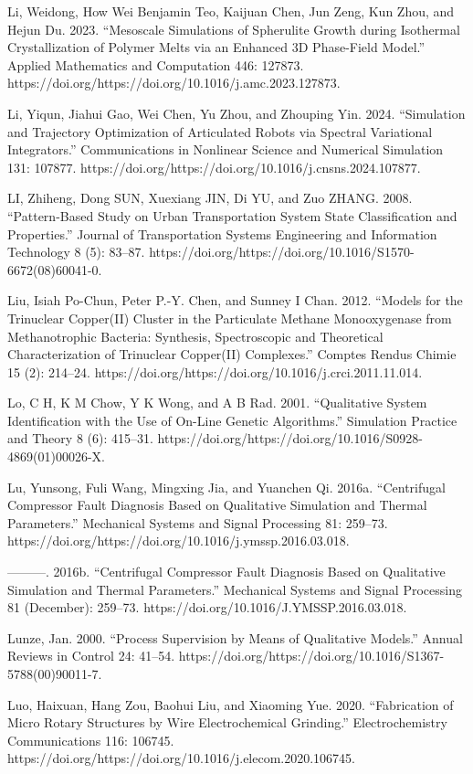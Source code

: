 \documentclass[utf8]{gradu3}
\begin{document}
Li, Weidong, How Wei Benjamin Teo, Kaijuan Chen, Jun Zeng, Kun Zhou, and Hejun Du. 2023. “Mesoscale Simulations of Spherulite Growth during Isothermal Crystallization of Polymer Melts via an Enhanced 3D Phase-Field Model.” Applied Mathematics and Computation 446: 127873. https://doi.org/https://doi.org/10.1016/j.amc.2023.127873.

Li, Yiqun, Jiahui Gao, Wei Chen, Yu Zhou, and Zhouping Yin. 2024. “Simulation and Trajectory Optimization of Articulated Robots via Spectral Variational Integrators.” Communications in Nonlinear Science and Numerical Simulation 131: 107877. https://doi.org/https://doi.org/10.1016/j.cnsns.2024.107877.

LI, Zhiheng, Dong SUN, Xuexiang JIN, Di YU, and Zuo ZHANG. 2008. “Pattern-Based Study on Urban Transportation System State Classification and Properties.” Journal of Transportation Systems Engineering and Information Technology 8 (5): 83–87. https://doi.org/https://doi.org/10.1016/S1570-6672(08)60041-0.

Liu, Isiah Po-Chun, Peter P.-Y. Chen, and Sunney I Chan. 2012. “Models for the Trinuclear Copper(II) Cluster in the Particulate Methane Monooxygenase from Methanotrophic Bacteria: Synthesis, Spectroscopic and Theoretical Characterization of Trinuclear Copper(II) Complexes.” Comptes Rendus Chimie 15 (2): 214–24. https://doi.org/https://doi.org/10.1016/j.crci.2011.11.014.

Lo, C H, K M Chow, Y K Wong, and A B Rad. 2001. “Qualitative System Identification with the Use of On-Line Genetic Algorithms.” Simulation Practice and Theory 8 (6): 415–31. https://doi.org/https://doi.org/10.1016/S0928-4869(01)00026-X.

Lu, Yunsong, Fuli Wang, Mingxing Jia, and Yuanchen Qi. 2016a. “Centrifugal Compressor Fault Diagnosis Based on Qualitative Simulation and Thermal Parameters.” Mechanical Systems and Signal Processing 81: 259–73. https://doi.org/https://doi.org/10.1016/j.ymssp.2016.03.018.

———. 2016b. “Centrifugal Compressor Fault Diagnosis Based on Qualitative Simulation and Thermal Parameters.” Mechanical Systems and Signal Processing 81 (December): 259–73. https://doi.org/10.1016/J.YMSSP.2016.03.018.

Lunze, Jan. 2000. “Process Supervision by Means of Qualitative Models.” Annual Reviews in Control 24: 41–54. https://doi.org/https://doi.org/10.1016/S1367-5788(00)90011-7.

Luo, Haixuan, Hang Zou, Baohui Liu, and Xiaoming Yue. 2020. “Fabrication of Micro Rotary Structures by Wire Electrochemical Grinding.” Electrochemistry Communications 116: 106745. https://doi.org/https://doi.org/10.1016/j.elecom.2020.106745.
\end{document}
